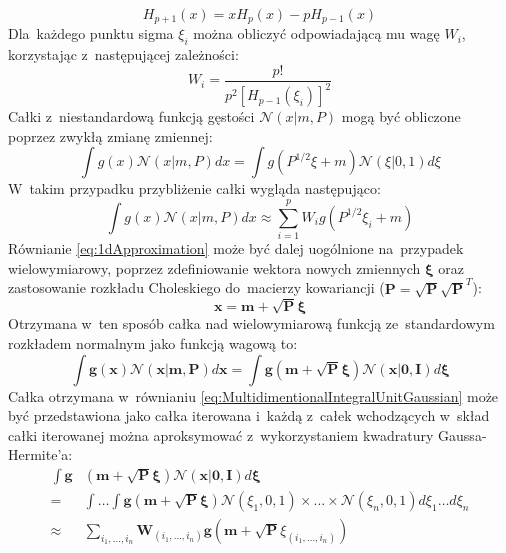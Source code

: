 \begin{equation}
	H_{p+1}(x)=xH_p(x)-pH_{p-1}(x)
\end{equation}
Dla~każdego punktu sigma $\xi_i$ można obliczyć odpowiadającą mu wagę $W_i$, korzystając z~następującej zależności:
\begin{equation}
W_i = \frac{p!}{p^2[H_{p-1}(\xi_i)]^2}
\end{equation}
Całki z~niestandardową funkcją gęstości $\mathcal{N}(x|m, P)$ mogą być obliczone poprzez zwykłą zmianę zmiennej:
\begin{equation}
\int g(x)\mathcal{N}(x|m,P)dx = \int g(P^{1/2}\xi + m)\mathcal{N}(\xi|0,1) d\xi
\end{equation}
W~takim przypadku przybliżenie całki wygląda następująco:
\begin{equation} \label{eq:1dApproximation}
\int g(x)\mathcal{N}(x|m,P)dx \approx \sum_{i=1}^{p} W_i g(P^{1/2}\xi_i + m)
\end{equation}
Równianie \ref{eq:1dApproximation} może być dalej uogólnione na~przypadek wielowymiarowy, poprzez zdefiniowanie wektora nowych zmiennych $\boldsymbol{\xi}$ oraz zastosowanie rozkładu Choleskiego do~macierzy kowariancji ($\boldsymbol{P}=\sqrt{\boldsymbol{P}}\sqrt{\boldsymbol{P}}^T$):
\begin{equation}
	\boldsymbol{x}=\boldsymbol{m}+\sqrt{\boldsymbol{P}}\boldsymbol{\xi}
\end{equation}
Otrzymana w~ten sposób całka nad wielowymiarową funkcją ze~standardowym rozkładem normalnym jako funkcją wagową to:
\begin{equation} \label{eq:MultidimentionalIntegralUnitGaussian}
\int \boldsymbol{g}(\boldsymbol{x})\mathcal{N}(\boldsymbol{x}|\boldsymbol{m},\boldsymbol{P})d\boldsymbol{x} = \int \boldsymbol{g}(\boldsymbol{m} + \sqrt{\boldsymbol{P}}\boldsymbol{\xi})\mathcal{N}(\boldsymbol{x}|\boldsymbol{0},\boldsymbol{I})d\boldsymbol{\xi}
\end{equation}
Całka otrzymana w~równianiu \ref{eq:MultidimentionalIntegralUnitGaussian} może być przedstawiona jako całka iterowana i~każdą z~całek wchodzących w~skład całki iterowanej można aproksymować z~wykorzystaniem kwadratury Gaussa-Hermite'a:
\begin{align}
\int \boldsymbol{g}&(\boldsymbol{m} + \sqrt{\boldsymbol{P}}\boldsymbol{\xi})\mathcal{N}(\boldsymbol{x}|\boldsymbol{0},\boldsymbol{I})d\boldsymbol{\xi} \nonumber \\ = &\int \dots \int \boldsymbol{g}(\boldsymbol{m} + \sqrt{\boldsymbol{P}}\boldsymbol{\xi})\mathcal{N}(\xi_1, 0, 1) \times \dots \times \mathcal{N}(\xi_n, 0, 1) d\xi_1 \dots d\xi_n \nonumber \\ \approx & \sum_{i_1,\dots,i_n}^{}\boldsymbol{W}_{(i_1, \dots, i_n)} \boldsymbol{g}(\boldsymbol{m} + \sqrt{\boldsymbol{P}}\xi_{(i_1, \dots, i_n)} )
\end{align}
